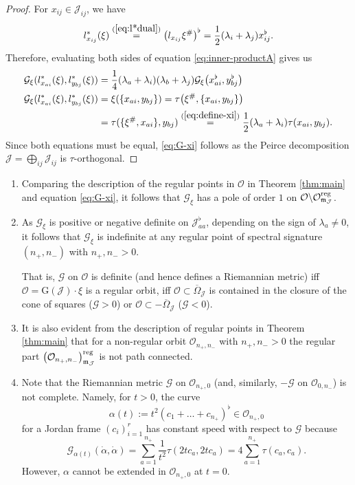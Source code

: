 \documentclass[pdftex]{sigma}
\numberwithin{equation}{section}
\newcommand{\ocal}{\mathcal{O}}
\newcommand{\Jcal}{\mathcal{J}}
\newcommand{\m}{\mathfrak{m}}
\newcommand{\G}{\mathrm{G}}
\renewcommand{\m}{{\mathfrak m}}
\newcommand{\Gcal}{\mathcal{G}}
\begin{document}
\begin{proof}
For $x_{ij} \in \Jcal_{ij}$, we have
\[
l_{x_{ij}}^\ast(\xi) \stackrel{(\ref{eq:l*dual})}= \big(l_{x_{ij}}\xi^\#\big)^\flat = \frac12 (\lambda_i + \lambda_j) x_{ij}^\flat.
\]
Therefore, evaluating both sides of equation \eqref{eq:inner-productA} gives us
\begin{align*}
\Gcal_\xi(l_{x_{ai}}^\ast(\xi), l_{y_{bj}}^\ast(\xi)) & = \frac14 (\lambda_a + \lambda_i)(\lambda_b + \lambda_j) \Gcal_\xi\big(x_{ai}^\flat, y_{bj}^\flat\big)\\
\Gcal_\xi(l_{x_{ai}}^\ast(\xi), l_{y_{bj}}^\ast(\xi)) & = \xi(\{x_{ai}, y_{bj}\}) = \tau\big(\xi^\#, \{x_{ai}, y_{bj}\}\big)\\
& = \tau(\{\xi^\#, x_{ai}\}, y_{bj}) \stackrel{(\ref{eq:define-xi})} = \frac12 (\lambda_a + \lambda_i) \tau(x_{ai}, y_{bj}).
\end{align*}
Since both equations must be equal, \eqref{eq:G-xi} follows as the Peirce decomposition ${\Jcal =  \bigoplus_{ij} \Jcal_{ij}}$ is $\tau$-orthogonal.
\end{proof}

\begin{Remark}\quad
\begin{enumerate}\itemsep=0pt
\item[(1)]
Comparing the description of the regular points in $\ocal$ in Theorem \ref{thm:main} and equation \eqref{eq:G-xi}, it follows that $\Gcal_\xi$ has a pole of order $1$ on $\ocal \backslash \ocal^{\rm reg}_{\m_{\Jcal}}$.

\item[(2)]
As $\Gcal_\xi$ is positive or negative definite on $\Jcal_{aa}^\flat$, depending on the sign of $\lambda_a \neq 0$, it follows that $\Gcal_\xi$ is indefinite at any regular point of spectral signature $(n_+, n_-)$ with $n_+, n_- > 0$.

That is, $\Gcal$ on $\ocal$ is definite (and hence defines a Riemannian metric) iff $\ocal = \G(\Jcal) \cdot \xi$ is a regular orbit, iff $\ocal \subset \overline{\Omega}_\Jcal$ is contained in the closure of the cone of squares ($\Gcal > 0$) or $\ocal \subset -\overline{\Omega}_\Jcal$ ($\Gcal < 0$).

\item[(3)]
It is also evident from the description of regular points in Theorem \ref{thm:main} that for a non-regular orbit $\ocal_{n_+,n_-}$ with $n_+,n_- > 0$ the regular part $\left(\ocal_{n_+,n_-}\right)^{\rm reg}_{\m_{\Jcal}}$ is not path connected.

\item[(4)]
Note that the Riemannian metric $\Gcal$ on $\ocal_{n_+,0}$ (and, similarly, $-\Gcal$ on $\ocal_{0,n_-}$) is not complete.
Namely, for $t>0$, the curve
\[
\alpha(t) := t^2 (c_1 + \dots + c_{n_+})^\flat \in \ocal_{n_+,0}
\]
for a Jordan frame $(c_i)_{i=1}^r$ has constant speed with respect to $\Gcal$ because
\[
\Gcal_{\alpha(t)}(\dot \alpha, \dot \alpha) = \sum_{a=1}^{n_+} \frac1{t^2} \tau(2t c_a, 2t c_a) = 4 \sum_{a=1}^{n_+} \tau(c_a, c_a).
\]
However, $\alpha$ cannot be extended in $\ocal_{n_+,0}$ at $t = 0$.
\end{enumerate}
\end{Remark}
\end{document}
